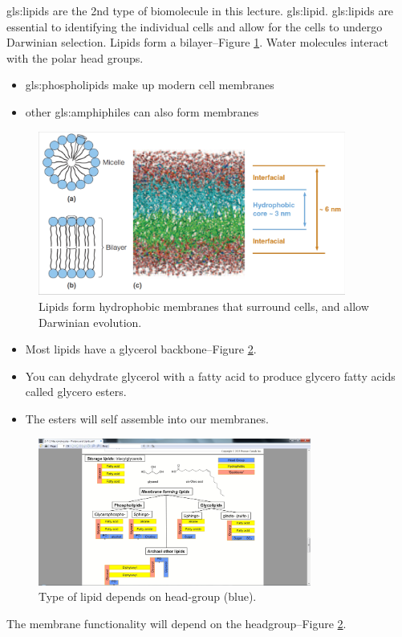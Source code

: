 \documentclass[]{article}
\begin{document}
\Glspl{gls:lipid}\cite[14.2 Lipids \& Triglycerides]{brown2009chemistry} are the 2nd type  of biomolecule in this lecture. \glsdesc{gls:lipid}.  \Glspl{gls:lipid} are essential to identifying the individual cells and allow for the cells to undergo Darwinian selection. Lipids form a bilayer--Figure \ref{fig:Lipids}. Water molecules interact with the polar head groups.

\begin{itemize}
	\item \glspl{gls:phospholipid} make up modern cell membranes
	\item other \glspl{gls:amphiphile} can also form membranes
\end{itemize}

\begin{figure}[H]
	\caption[How lipids  allow Darwinian evolution.]{Lipids form hydrophobic membranes that surround cells, and allow Darwinian evolution.}\label{fig:Lipids} 
	\includegraphics[width=0.9\textwidth]{Lipids}
\end{figure}

\begin{itemize}
	\item Most lipids have a glycerol backbone--Figure \ref{fig:LipidTypes}.
	\item You can dehydrate glycerol with a fatty acid to produce glycero fatty acids called glycero esters.
	\item The esters will self assemble into our membranes.
\end{itemize}
\begin{figure}[H]
	\begin{center}
		\caption[Type of lipid depends on head-group]{Type of lipid depends on head-group (blue).}\label{fig:LipidTypes} 
		\includegraphics[width=0.8\textwidth]{LipidTypes}
	\end{center}
\end{figure}
The membrane functionality will depend on the headgroup--Figure \ref{fig:LipidTypes}.
\end{document}
